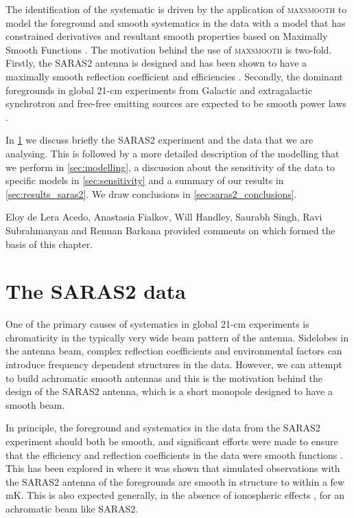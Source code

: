 The identification of the systematic is driven by the application of \textsc{maxsmooth} \citep[see \cref{ch:maxsmooth}, ][]{Bevins2020, Bevins_maxsmooth_2021} to model the foreground and smooth systematics in the data with a model that has constrained derivatives and resultant smooth properties based on Maximally Smooth Functions \citep[MSFs, ][]{Sathyanarayana2015, Sathyanarayana_msf_2017}. The motivation behind the use of \textsc{maxsmooth} is two-fold. Firstly, the SARAS2 antenna is designed and has been shown to have a maximally smooth reflection coefficient and efficiencies \citep{SARAS2_radiometer_2018}. Secondly, the dominant foregrounds in global 21-cm experiments from Galactic and extragalactic synchrotron and free-free emitting sources are expected to be smooth power laws \citep{Sathyanarayana_msf_2017, Bernardi_galaxy_2009, Nitu_background_2021}.

In \cref{sec:data} we discuss briefly the SARAS2 experiment and the data that we are analysing. This is followed by a more detailed description of the modelling that we perform in \cref{sec:modelling}, a discussion about the sensitivity of the data to specific models in \cref{sec:sensitivity} and a summary of our results in \cref{sec:results_saras2}. We draw conclusions in \cref{sec:saras2_conclusions}.

Eloy de Lera Acedo, Anastasia Fialkov, Will Handley, Saurabh Singh, Ravi Subrahmanyan and Rennan Barkana provided comments on \cite{Bevins_SARAS2_2022} which formed the basis of this chapter.

\section{The SARAS2 data}
\label{sec:data}

One of the primary causes of systematics in global 21-cm experiments is chromaticity in the typically very wide beam pattern of the antenna. Sidelobes in the antenna beam, complex reflection coefficients and environmental factors can introduce frequency dependent structures in the data. However, we can attempt to build achromatic smooth antennas and this is the motivation behind the design of the SARAS2 antenna, which is a short monopole designed to have a smooth beam. 

In principle, the foreground and systematics in the data from the SARAS2 experiment should both be smooth, and significant efforts were made to ensure that the efficiency and reflection coefficients in the data were smooth functions \citep{SARAS2_radiometer_2018}. This has been explored in \cite{Sathyanarayana_msf_2017} where it was shown that simulated observations with the SARAS2 antenna of the foregrounds \citep[produced with the Global Model for the Radio Sky Spectrum,][]{Sathyanarayana2016} are smooth in structure to within a few mK. This is also expected generally, in the absence of ionospheric effects \citep{Shen_ionosphere_2021}, for an achromatic beam like SARAS2.

